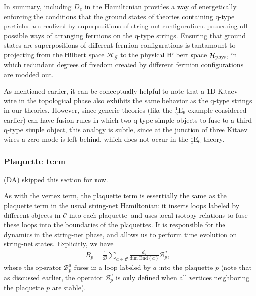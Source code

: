 \documentclass[12pt,a4paper]{article}
\newcommand{\mcb}{\mathcal{B}}
\newcommand{\mcd}{\mathcal{D}}
\newcommand{\mcg}{\mathcal{G}}
\newcommand{\mch}{\mathcal{H}}
\newcommand{\mcc}{\mathcal{C}}
\newcommand{\dave}[1]{{\color{ao(english)}\footnotesize{(DA) #1}}}
\newcommand{\halfesix}{\frac{1}{2}\text{E}_6}
\begin{document}
In summary, including $D_e$ in the Hamiltonian provides a way of energetically enforcing the conditions that the ground states of theories containing q-type particles are realized by superpositions of string-net configurations possessing all possible ways of arranging fermions on the q-type strings. 
Ensuring that ground states are superpositions of different fermion configurations is tantamount to projecting from the Hilbert space $\mch_\mcg$ to the physical Hilbert space $\mch_{\rm phys}$, in which redundant degrees of freedom created by different fermion configurations are modded out.


As mentioned earlier, it can be conceptually helpful to note that a 1D Kitaev wire in the topological phase also exhibits the same behavior as the q-type strings in our theories.
However, since generic theories (like the $\halfesix$ example considered earlier) can have fusion rules in which two q-type simple objects to fuse to a third q-type simple object, this analogy is subtle, since at the junction of three Kitaev wires a zero mode is left behind, which does not occur in the $\halfesix$ theory. 





\subsubsection{Plaquette term}
\dave{skipped this section for now.}

As with the vertex term, the plaquette term is essentially the same as the plaquette term in the usual string-net Hamiltonian: it inserts loops labeled by different objects in $\mcc$ into each plaquette, and uses local isotopy relations to fuse these loops into the boundaries of the plaquettes. 
It is responsible for the dynamics in the string-net phase, and allows us to perform time evolution on string-net states.  
Explicitly, we have
\begin{align} \label{plaquette_term_defn}
B_p =\frac{1}{\mcd} \sum_{a \in \mcc} \frac{d_a}{\text{dim} \; \text{End}(a)} \mcb^a_p, 
\end{align}
where the operator $\mcb_p^a$ fuses in a loop labeled by $a$ into the plaquette $p$ (note that 
as discussed earlier, the operator $\mcb_p^a$ is only defined when all vertices neighboring the plaquette $p$ are stable).
\end{document}
